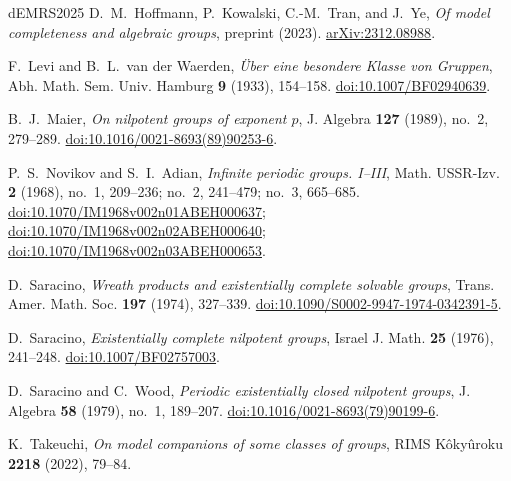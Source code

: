 \documentclass[11pt,reqno]{article}
\theoremstyle{definition}
\theoremstyle{remark}
\begin{document}
\begin{thebibliography}{dEMRS2025}
D.~M.~Hoffmann, P.~Kowalski, C.-M.~Tran, and J.~Ye,
\emph{Of model completeness and algebraic groups},
preprint (2023).
\href{https://arxiv.org/abs/2312.08988}{arXiv:2312.08988}.


F.~Levi and B.~L.~van der Waerden,
\emph{\"Uber eine besondere Klasse von Gruppen},
Abh. Math. Sem. Univ. Hamburg \textbf{9} (1933), 154--158.
\href{https://doi.org/10.1007/BF02940639}
     {doi:10.1007/BF02940639}.

B.~J.~Maier,
\emph{On nilpotent groups of exponent $p$},
J. Algebra \textbf{127} (1989), no.~2, 279--289.
\href{https://doi.org/10.1016/0021-8693(89)90253-6}
     {doi:10.1016/0021-8693(89)90253-6}.

P.~S.~Novikov and S.~I.~Adian,
\emph{Infinite periodic groups. I--III},
Math. USSR-Izv. \textbf{2} (1968),
no.~1, 209--236;
no.~2, 241--479;
no.~3, 665--685.
\href{https://doi.org/10.1070/IM1968v002n01ABEH000637}
     {doi:10.1070/IM1968v002n01ABEH000637};
\href{https://doi.org/10.1070/IM1968v002n02ABEH000640}
     {doi:10.1070/IM1968v002n02ABEH000640};
\href{https://doi.org/10.1070/IM1968v002n03ABEH000653}
     {doi:10.1070/IM1968v002n03ABEH000653}.

D.~Saracino,
\emph{Wreath products and existentially complete solvable groups},
Trans. Amer. Math. Soc. \textbf{197} (1974), 327--339.
\href{https://doi.org/10.1090/S0002-9947-1974-0342391-5}
     {doi:10.1090/S0002-9947-1974-0342391-5}.

D.~Saracino,
\emph{Existentially complete nilpotent groups},
Israel J. Math. \textbf{25} (1976), 241--248.
\href{https://doi.org/10.1007/BF02757003}
     {doi:10.1007/BF02757003}.

D.~Saracino and C.~Wood,
\emph{Periodic existentially closed nilpotent groups},
J. Algebra \textbf{58} (1979), no.~1, 189--207.
\href{https://doi.org/10.1016/0021-8693(79)90199-6}
     {doi:10.1016/0021-8693(79)90199-6}.

K.~Takeuchi,
\emph{On model companions of some classes of groups},
RIMS K\^oky\^uroku \textbf{2218} (2022), 79--84.


\end{thebibliography}
\end{document}
